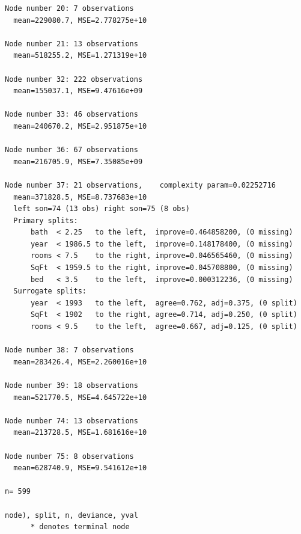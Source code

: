 \documentclass[11pt,a4paper]{article}
\begin{document}
\begin{lstlisting}[style=console]
Node number 20: 7 observations
  mean=229080.7, MSE=2.778275e+10 

Node number 21: 13 observations
  mean=518255.2, MSE=1.271319e+10 

Node number 32: 222 observations
  mean=155037.1, MSE=9.47616e+09 

Node number 33: 46 observations
  mean=240670.2, MSE=2.951875e+10 

Node number 36: 67 observations
  mean=216705.9, MSE=7.35085e+09 

Node number 37: 21 observations,    complexity param=0.02252716
  mean=371828.5, MSE=8.737683e+10 
  left son=74 (13 obs) right son=75 (8 obs)
  Primary splits:
      bath  < 2.25   to the left,  improve=0.464858200, (0 missing)
      year  < 1986.5 to the left,  improve=0.148178400, (0 missing)
      rooms < 7.5    to the right, improve=0.046565460, (0 missing)
      SqFt  < 1959.5 to the right, improve=0.045708800, (0 missing)
      bed   < 3.5    to the left,  improve=0.000312236, (0 missing)
  Surrogate splits:
      year  < 1993   to the left,  agree=0.762, adj=0.375, (0 split)
      SqFt  < 1902   to the right, agree=0.714, adj=0.250, (0 split)
      rooms < 9.5    to the left,  agree=0.667, adj=0.125, (0 split)

Node number 38: 7 observations
  mean=283426.4, MSE=2.260016e+10 

Node number 39: 18 observations
  mean=521770.5, MSE=4.645722e+10 

Node number 74: 13 observations
  mean=213728.5, MSE=1.681616e+10 

Node number 75: 8 observations
  mean=628740.9, MSE=9.541612e+10 

n= 599 

node), split, n, deviance, yval
      * denotes terminal node


\end{lstlisting}
\end{document}
